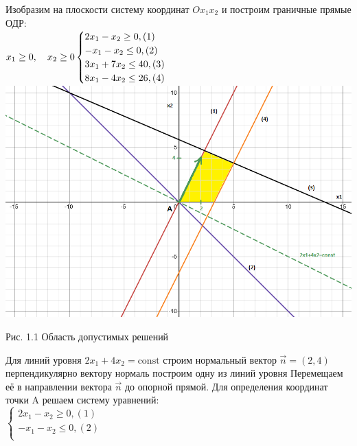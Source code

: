\documentclass[a4paper, 12pt]{article}
\begin{document}
Изобразим на плоскости систему координат $Ox_1x_2$ и построим граничные прямые ОДР:\\

\begin{math}
  x_1\geq 0, \quad x_2\geq 0\\
  \begin{cases}
    2x_1-x_2 \geq 0,(1)\\
    -x_1-x_2 \leq 0,(2)\\
    3x_1+7x_2 \leq 40,(3)\\
    8x_1-4x_2 \leq 26,(4)\\
  \end{cases}\\
\end{math}\\

\includegraphics[width=\textwidth]{1-1.png}
\begin{center}
  Рис. 1.1 Область допустимых решений
\end{center}

Для линий уровня $2x_1+4x_2 = \text{const}$ строим нормальный вектор $\vec{n} = (2,4)$ перпендикулярно вектору нормаль построим одну из линий уровня Перемещаем её в направлении вектора $\vec{n}$ до опорной прямой. Для определения координат точки A решаем систему уравнений:\\

\begin{math}
  \begin{cases}
    2x_1-x_2 \geq 0,(1)\\
    -x_1-x_2 \leq 0,(2)\\
  \end{cases}
\end{math}\\
\end{document}

